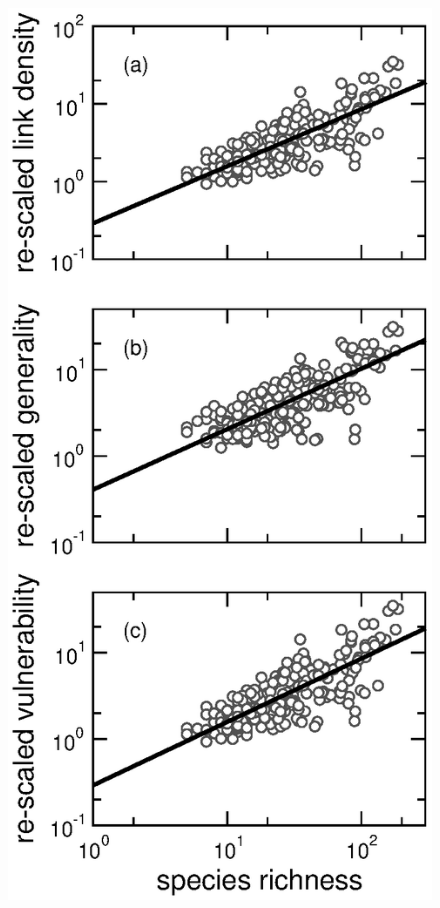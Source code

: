 \documentclass[12pt]{article}
\begin{document}
\begin{figure}[h]
\centerline{\includegraphics*[height=.5\textheight]{Figures/by_TL/scaling_with_S/proportions/S_fitlines_nonts_corrected.eps}}

\end{figure}
\end{document}
